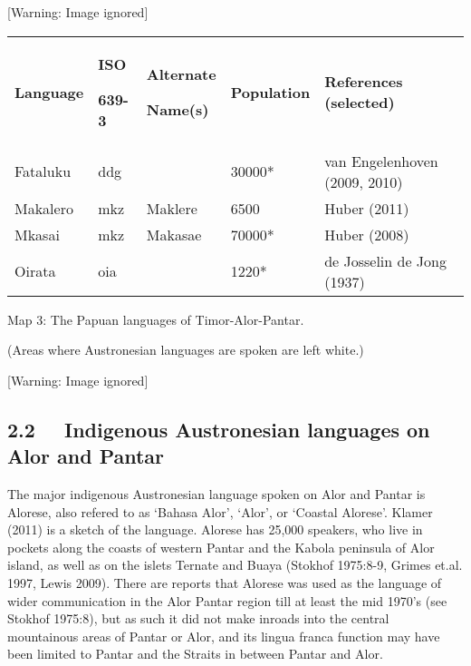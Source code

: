   [Warning: Image ignored] %
 


\begin{center}
\tablehead{}
\begin{supertabular}{m{0.8059598in}m{0.54345983in}m{0.9490598in}m{0.9115598in}m{2.29486in}}
\bfseries Language &
{\bfseries ISO }

\bfseries 639-3 &
{\bfseries Alternate }

\bfseries Name(s) &
\bfseries Population &
\bfseries References (selected)\\
Fataluku &
ddg &
 &
30000* &
van Engelenhoven (2009, 2010)\\
Makalero &
mkz &
Maklere &
6500 &
Huber (2011)\\
Mkasai &
mkz &
Makasae &
70000* &
Huber (2008)\\
Oirata &
oia &
 &
1220* &
de Josselin de Jong (1937)\\\hline
\end{supertabular}
\end{center}
{\centering
Map 3: The Papuan languages of Timor-Alor-Pantar.
\par}

{\centering
(Areas where Austronesian languages are spoken are left white.)
\par}

  [Warning: Image ignored] %
 

\clearpage\subsection[2.2 \ \ Indigenous Austronesian languages on Alor and Pantar ]{2.2 \ \ Indigenous Austronesian languages on Alor and Pantar }
The major indigenous Austronesian language spoken on Alor and Pantar is Alorese, also refered to as {\textquoteleft}Bahasa Alor{\textquoteright}, {\textquoteleft}Alor{\textquoteright}, or {\textquoteleft}Coastal Alorese{\textquoteright}. Klamer (2011) is a sketch of the language. Alorese has 25,000 speakers, who live in pockets along the coasts of western Pantar and the Kabola peninsula of Alor island, as well as on the islets Ternate and Buaya (Stokhof 1975:8-9, Grimes et.al. 1997, Lewis 2009). There are reports that Alorese was used as the language of wider communication in the Alor Pantar region till at least the mid 1970{\textquoteright}s (see Stokhof 1975:8), but as such it did not make inroads into the central mountainous areas of Pantar or Alor, and its lingua franca function may have been limited to Pantar and the Straits in between Pantar and Alor.

